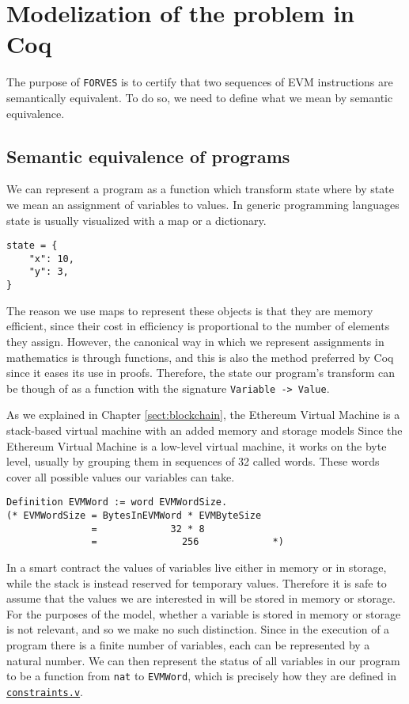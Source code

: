 \chapter{Modelization of the problem in Coq}
\label{cap:definitions}

The purpose of \texttt{FORVES} is to certify that two sequences of EVM instructions are 
semantically equivalent. To do so, we need to define what we mean by semantic equivalence.


\section{Semantic equivalence of programs}

We can represent a program as a function which transform state where by state we mean an assignment of 
variables to values. In generic programming languages state is usually visualized with a map or a
dictionary.

\begin{verbatim}
state = {
    "x": 10,
    "y": 3,
}
\end{verbatim}

The reason we use maps to represent these objects is that they are memory efficient, since their 
cost in efficiency is proportional to the number of elements they assign. However, the canonical 
way in which we represent assignments in mathematics is through functions, and this is also the 
method preferred by Coq since it eases its use in proofs. Therefore, the state our program's 
transform can be though of as a function with the signature \texttt{Variable -> Value}.

As we explained in Chapter \ref{sect:blockchain}, the Ethereum Virtual Machine is a stack-based
virtual machine with an added memory and storage models Since the Ethereum Virtual Machine is a 
low-level virtual machine, it works on the byte level, usually by grouping them in sequences of 
32 called words. These words cover all possible values our variables can take.

\begin{verbatim}
Definition EVMWord := word EVMWordSize. 
(* EVMWordSize = BytesInEVMWord * EVMByteSize
               =             32 * 8
               =               256             *)
\end{verbatim}

In a smart contract the values of variables live either in memory or in storage, while the stack is
instead reserved for temporary values. Therefore it is safe to assume that the values we are 
interested in will be stored in memory or storage. For the purposes of the model, whether a variable
is stored in memory or storage is not relevant, and so we make no such distinction. Since in the
execution of a program there is a finite number of variables, each can be represented by a natural
number. We can then represent the status of all variables in our program to be a function from 
\texttt{nat} to \texttt{EVMWord}, which is precisely how they are defined in 
\href{https://github.com/costa-group/forves2/blob/8ec2a66dd44e0c695668d04dbe08f68ef5b56fb4/constraints.v}
{\texttt{constraints.v}}.

